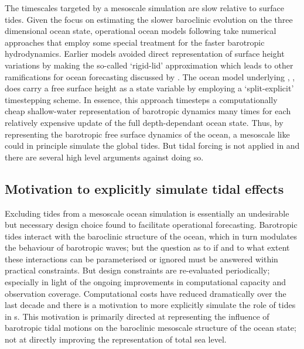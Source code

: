 The timescales targeted by a mesoscale simulation are slow relative to surface tides.
Given the focus on estimating the slower baroclinic evolution on the three dimensional ocean state, operational ocean models following \GODAE{} take numerical approaches that employ some special treatment for the faster barotropic hydrodynamics. 
Earlier models avoided direct representation of surface height variations by making the so-called `rigid-lid' approximation \citep[pp128]{gill1982atmosphere} which leads to other ramifications for ocean forecasting discussed by \citep[pp19]{Griffies:2004vs}.
The ocean model underlying \BL{}, \MOM{} \citep{Griffies:2008vh}, does carry a free surface height as a state variable by employing a `split-explicit' timestepping scheme.    
In essence, this approach timesteps a computationally cheap shallow-water representation of barotropic dynamics many times for each relatively expensive update of the full depth-dependant ocean state.  
Thus, by representing the barotropic free surface dynamics of the ocean, a mesoscale \OGCM{} like \BL{} could in principle simulate the global tides.
But tidal forcing is not applied in \BL{} and there are several high level arguments against doing so.
   
\subsection{Motivation to explicitly simulate tidal effects}

Excluding tides from a mesoscale ocean simulation is essentially an undesirable but necessary design choice found to facilitate operational forecasting.
Barotropic tides interact with the baroclinic structure of the ocean, which in turn modulates the behaviour of barotropic waves; but the question as to if and to what extent these interactions can be parameterised or ignored must be answered within practical constraints.
But design constraints are re-evaluated periodically; especially in light of the ongoing improvements in computational capacity and observation coverage.
Computational costs have reduced dramatically over the last decade and there is a motivation  to more explicitly simulate the role of tides in \OGCM{}s.
This motivation is primarily directed at representing the influence of barotropic tidal motions on the baroclinic mesoscale structure of the ocean state; not at directly improving the representation of total sea level.

